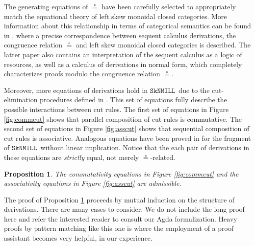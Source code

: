 \documentclass[sn-mathphys-num]{sn-jnl}%
\newcommand{\SkNMILL}{$\mathtt{SkNMILL}$}
\newcommand{\niccolo}[1]{\textcolor{red}{NV: #1}}
\theoremstyle{thmstyleone}%
\newtheorem{proposition}[theorem]{Proposition}%
\theoremstyle{thmstyletwo}%
\theoremstyle{thmstylethree}%
\begin{document}
The generating equations of $\circeq$ have been carefully selected to appropriately match the equational theory of left skew monoidal closed categories. More information about this relationship in terms of categorical semantics can be found in \cite{UVW:protsn}, where a precise correspondence between sequent calculus derivations, the congruence relation $\circeq$ and left skew monoidal closed categories is described.
The latter paper also contains an interpretation of the sequent calculus as a logic of resources, as well as a calculus of derivations in normal form, which completely characterizes proofs modulo the congruence relation $\circeq$.

Moreover, more equations of derivations hold in \SkNMILL~due to the cut-elimination procedures defined in \cite{UVW:protsn,wan2024}.
This set of equations fully describe the possible interactions between cut rules. The first set of equations in Figure \ref{fig:commcut} shows that parallel composition of cut rules is commutative. The second set of equations in Figure \ref{fig:asscut} shows that sequential composition of cut rules is associative.
Analogous equations have been proved in \cite{uustalu:sequent:2021} for the fragment of \SkNMILL~without linear implication.
Notice that the each pair of derivations in these equations are \emph{strictly} equal, not merely $\circeq$-related.

\begin{proposition}\label{prop:cut}
  The commutativity equations in Figure \ref{fig:commcut} and the associativity equations in Figure \ref{fig:asscut} are admissible.
\end{proposition}

The proof of Proposition \ref{prop:cut} proceeds by mutual induction on the structure of derivations.
  There are many cases to consider. We do not include the long proof here and refer the interested reader to consult our Agda formalization. Heavy proofs by pattern matching like this one is where the employment of a proof assistant becomes very helpful, in our experience.
\end{document}
